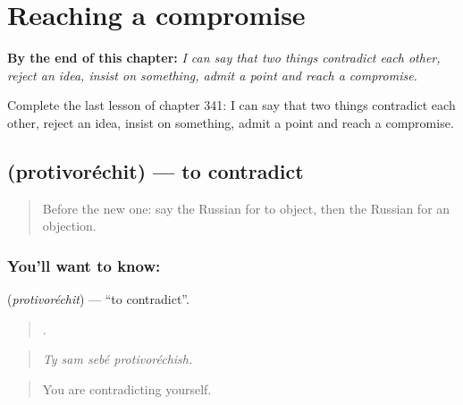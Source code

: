 
\chapter{Reaching a compromise}
\label{ch:ru-reaching-a-compromise}

\begin{chapteropening}
\textbf{By the end of this chapter:} \emph{I can say that two things contradict each other, reject an idea, insist on something, admit a point and reach a compromise.}

Complete the last lesson of chapter 341: I can say that two things contradict each other, reject an idea, insist on something, admit a point and reach a compromise.
\end{chapteropening}

\section[\texorpdfstring{\ru{противоречить} (protivoréchit)}{противоречить (protivoréchit)}]{ (protivoréchit) — to contradict}

\label{lesson:RU-C341-protivorechit}



\begin{quote}
Before the new one: say the Russian for to object, then the Russian for an objection.
\end{quote}

\subsection*{You'll want to know: }
\textbf{} (\emph{protivoréchit}) — \textquotedblleft{}to contradict\textquotedblright{}.

\begin{quote}
   .
\end{quote}

\begin{quote}
\emph{Ty sam sebé protivoréchish.}
\end{quote}

\begin{quote}
You are contradicting yourself.
\end{quote}

